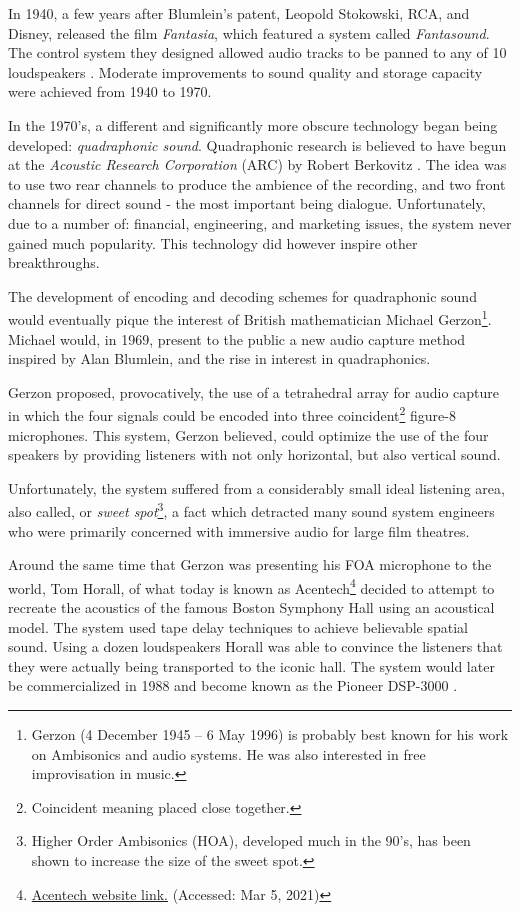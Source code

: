 In 1940, a few years after Blumlein's patent, Leopold Stokowski, RCA, and Disney, released the film \textit{Fantasia}, which featured a system called \textit{Fantasound}. The control system they designed allowed audio tracks to be panned to any of 10 loudspeakers \cite{klapholz1991fantasia}. Moderate improvements to sound quality and storage capacity were achieved from 1940 to 1970. 

In the 1970's, a different and significantly more obscure technology began being developed: \textit{quadraphonic sound}. Quadraphonic research is believed to have begun at the \textit{Acoustic Research Corporation} (ARC) by Robert Berkovitz \cite{davis2003history}. The idea was to use two rear channels to produce the ambience of the recording, and two front channels for direct sound - the most important being dialogue. Unfortunately, due to a number of: financial, engineering, and marketing issues, the system never gained much popularity. This technology did however inspire other breakthroughs.

The development of encoding and decoding schemes for quadraphonic sound would eventually pique the interest of British mathematician Michael Gerzon\footnote{Gerzon (4 December 1945 – 6 May 1996) is probably best known for his work on Ambisonics and audio systems. He was also interested in free improvisation in music.}. Michael would, in 1969, present to the public a new audio capture method inspired by Alan Blumlein, and the rise in interest in quadraphonics. 

Gerzon proposed, provocatively, the use of a tetrahedral array for audio capture in which the four signals could be encoded into three coincident\footnote{Coincident meaning placed close together.} figure-8 microphones. This system, Gerzon believed, could optimize the use of the four speakers by providing listeners with not only horizontal, but also vertical sound. 

Unfortunately, the system suffered from a considerably small ideal listening area, also called, or \textit{sweet spot}\footnote{Higher Order Ambisonics (HOA), developed much in the 90's, has been shown to increase the size of the sweet spot.}, a fact which detracted many sound system engineers who were primarily concerned with immersive audio for large film theatres.

Around the same time that Gerzon was presenting his FOA microphone to the world, Tom Horall, of what today is known as Acentech\footnote{\href{https://www.acentech.com/}{Acentech website link.} (Accessed: Mar 5, 2021)} decided to attempt to recreate the acoustics of the famous Boston Symphony Hall using an acoustical model. The system used tape delay techniques to achieve believable spatial sound. Using a dozen loudspeakers Horall was able to convince the listeners that they were actually being transported to the iconic hall. The system would later be commercialized in 1988 and become known as the Pioneer DSP-3000 \cite{davis2003history}. 

